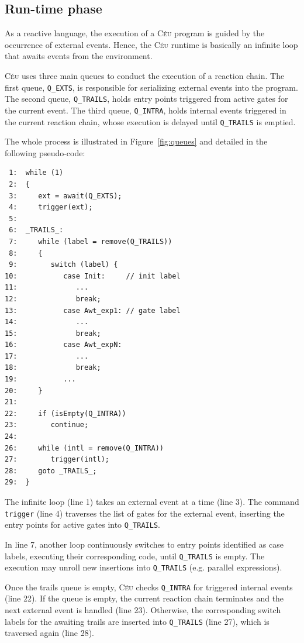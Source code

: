 \documentclass{sig-alternate-ipsn09}
\newcommand{\2}{\;\;}
\newcommand{\5}{\;\;\;\;\;}
\newcommand{\CEU}{\textsc{C\'{e}u}}
\newcommand{\code}[1] {{\small{\texttt{#1}}}}
\begin{document}
\subsection{Run-time phase}
\label{sec:impl:runtime}

As a reactive language, the execution of a \CEU{} program is guided by the 
occurrence of external events.
Hence, the \CEU{} runtime is basically an infinite loop that awaits events from 
the environment.

\CEU{} uses three main queues to conduct the execution of a reaction chain.
The first queue, \code{Q\_EXTS}, is responsible for serializing external events 
into the program.
The second queue, \code{Q\_TRAILS}, holds entry points triggered from active 
gates for the current event.
The third queue, \code{Q\_INTRA}, holds internal events triggered in the 
current reaction chain, whose execution is delayed until \code{Q\_TRAILS} is 
emptied.

The whole process is illustrated in Figure~\ref{fig:queues} and detailed in the 
following pseudo-code:

\begin{verbatim}
 1:  while (1)
 2:  {
 3:     ext = await(Q_EXTS);
 4:     trigger(ext);
 5:
 6:  _TRAILS_:
 7:     while (label = remove(Q_TRAILS))
 8:     {
 9:        switch (label) {
10:           case Init:     // init label
11:              ...
12:              break;
13:           case Awt_exp1: // gate label
14:              ...
15:              break;
16:           case Awt_expN:
17:              ...
18:              break;
19:           ...
20:     }
21:
22:     if (isEmpty(Q_INTRA))
23:        continue;
24:
26:     while (intl = remove(Q_INTRA))
27:        trigger(intl);
28:     goto _TRAILS_;
29:  }
\end{verbatim}

The infinite loop (line 1) takes an external event at a time (line 3).
The command \code{trigger} (line 4) traverses the list of gates for the 
external event, inserting the entry points for active gates into 
\code{Q\_TRAILS}.

In line 7, another loop continuously switches to entry points identified as 
case labels, executing their corresponding code, until \code{Q\_TRAILS} is 
empty.
The execution may unroll new insertions into \code{Q\_TRAILS} (e.g. parallel 
expressions).

Once the trails queue is empty, \CEU{} checks \code{Q\_INTRA} for triggered 
internal events (line 22).
If the queue is empty, the current reaction chain terminates and the next 
external event is handled (line 23).
Otherwise, the corresponding switch labels for the awaiting trails are inserted 
into \code{Q\_TRAILS} (line 27), which is traversed again (line 28).
\end{document}
